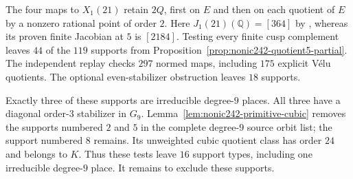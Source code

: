 The four maps to $X_1(21)$ retain $2Q$, first on $E$ and then on
each quotient of $E$ by a nonzero rational point of order $2$.
Here $J_1(21)(\mathbb Q)=[364]$ by
\cite[Theorem~4.13 and Table~2]{DEHMZ}, whereas its proven finite
Jacobian at $5$ is $[2184]$.
Testing every finite cusp complement leaves $44$ of the $119$
supports from Proposition~\ref{prop:nonic242-quotient5-partial}.
The independent replay checks $297$ normed maps, including
$175$ explicit V\'elu quotients. The optional even-stabilizer
obstruction leaves $18$ supports.

Exactly three of these supports are irreducible degree-$9$
places. All three have a diagonal order-$3$ stabilizer in $G_9$.
Lemma~\ref{lem:nonic242-primitive-cubic} removes the supports
numbered $2$ and $5$ in the complete degree-$9$ source orbit list;
the support numbered $8$ remains. Its unweighted cubic quotient
class has order $24$ and belongs to $K$.
Thus these tests leave $16$ support types, including one
irreducible degree-$9$ place. It remains to exclude these supports.
